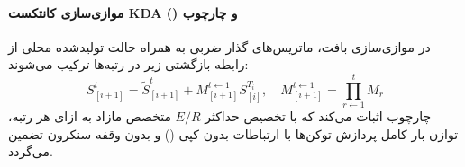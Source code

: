 \paragraph*{موازی‌سازی کانتکست KDA () و چارچوب }
در موازی‌سازی بافت، ماتریس‌های گذار ضربی به همراه حالت تولیدشده محلی از رابطه بازگشتی زیر در رتبه‌ها ترکیب می‌شوند:
\begin{equation}
    S_{[i+1]}^t = \tilde{S}_{[i+1]}^t + M_{[i+1]}^{t \leftarrow 1} S_{[i]}^{T_i}, \quad M_{[i+1]}^{t \leftarrow 1} = \prod_{r \leftarrow 1}^t M_r
\end{equation}
چارچوب  اثبات می‌کند که با تخصیص حداکثر $E/R$ متخصص مازاد به ازای هر رتبه، توازن بار کامل پردازش توکن‌ها با ارتباطات بدون کپی () و بدون وقفه سنکرون تضمین می‌گردد.